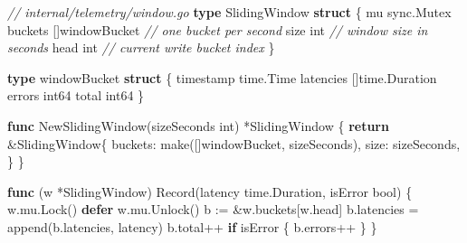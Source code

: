 \documentclass[
]{article}
\newenvironment{Shaded}{}{}
\newcommand{\BuiltInTok}[1]{\textcolor[rgb]{0.00,0.50,0.00}{#1}}
\newcommand{\CommentTok}[1]{\textcolor[rgb]{0.38,0.63,0.69}{\textit{#1}}}
\newcommand{\ControlFlowTok}[1]{\textcolor[rgb]{0.00,0.44,0.13}{\textbf{#1}}}
\newcommand{\DataTypeTok}[1]{\textcolor[rgb]{0.56,0.13,0.00}{#1}}
\newcommand{\KeywordTok}[1]{\textcolor[rgb]{0.00,0.44,0.13}{\textbf{#1}}}
\newcommand{\NormalTok}[1]{#1}
\newcommand{\OperatorTok}[1]{\textcolor[rgb]{0.40,0.40,0.40}{#1}}
\begin{document}
\begin{Shaded}
\begin{Highlighting}[]
\CommentTok{// internal/telemetry/window.go}
\KeywordTok{type}\NormalTok{ SlidingWindow }\KeywordTok{struct} \OperatorTok{\{}
\NormalTok{    mu       sync}\OperatorTok{.}\NormalTok{Mutex}
\NormalTok{    buckets  }\OperatorTok{[]}\NormalTok{windowBucket  }\CommentTok{// one bucket per second}
\NormalTok{    size     }\DataTypeTok{int}             \CommentTok{// window size in seconds}
\NormalTok{    head     }\DataTypeTok{int}             \CommentTok{// current write bucket index}
\OperatorTok{\}}

\KeywordTok{type}\NormalTok{ windowBucket }\KeywordTok{struct} \OperatorTok{\{}
\NormalTok{    timestamp time}\OperatorTok{.}\NormalTok{Time}
\NormalTok{    latencies }\OperatorTok{[]}\NormalTok{time}\OperatorTok{.}\NormalTok{Duration}
\NormalTok{    errors    }\DataTypeTok{int64}
\NormalTok{    total     }\DataTypeTok{int64}
\OperatorTok{\}}

\KeywordTok{func}\NormalTok{ NewSlidingWindow}\OperatorTok{(}\NormalTok{sizeSeconds }\DataTypeTok{int}\OperatorTok{)} \OperatorTok{*}\NormalTok{SlidingWindow }\OperatorTok{\{}
    \ControlFlowTok{return} \OperatorTok{\&}\NormalTok{SlidingWindow}\OperatorTok{\{}
\NormalTok{        buckets}\OperatorTok{:} \BuiltInTok{make}\OperatorTok{([]}\NormalTok{windowBucket}\OperatorTok{,}\NormalTok{ sizeSeconds}\OperatorTok{),}
\NormalTok{        size}\OperatorTok{:}\NormalTok{    sizeSeconds}\OperatorTok{,}
    \OperatorTok{\}}
\OperatorTok{\}}

\KeywordTok{func} \OperatorTok{(}\NormalTok{w }\OperatorTok{*}\NormalTok{SlidingWindow}\OperatorTok{)}\NormalTok{ Record}\OperatorTok{(}\NormalTok{latency time}\OperatorTok{.}\NormalTok{Duration}\OperatorTok{,}\NormalTok{ isError }\DataTypeTok{bool}\OperatorTok{)} \OperatorTok{\{}
\NormalTok{    w}\OperatorTok{.}\NormalTok{mu}\OperatorTok{.}\NormalTok{Lock}\OperatorTok{()}
    \ControlFlowTok{defer}\NormalTok{ w}\OperatorTok{.}\NormalTok{mu}\OperatorTok{.}\NormalTok{Unlock}\OperatorTok{()}
\NormalTok{    b }\OperatorTok{:=} \OperatorTok{\&}\NormalTok{w}\OperatorTok{.}\NormalTok{buckets}\OperatorTok{[}\NormalTok{w}\OperatorTok{.}\NormalTok{head}\OperatorTok{]}
\NormalTok{    b}\OperatorTok{.}\NormalTok{latencies }\OperatorTok{=} \BuiltInTok{append}\OperatorTok{(}\NormalTok{b}\OperatorTok{.}\NormalTok{latencies}\OperatorTok{,}\NormalTok{ latency}\OperatorTok{)}
\NormalTok{    b}\OperatorTok{.}\NormalTok{total}\OperatorTok{++}
    \ControlFlowTok{if}\NormalTok{ isError }\OperatorTok{\{}
\NormalTok{        b}\OperatorTok{.}\NormalTok{errors}\OperatorTok{++}
    \OperatorTok{\}}
\OperatorTok{\}}


\end{Highlighting}
\end{Shaded}
\end{document}
